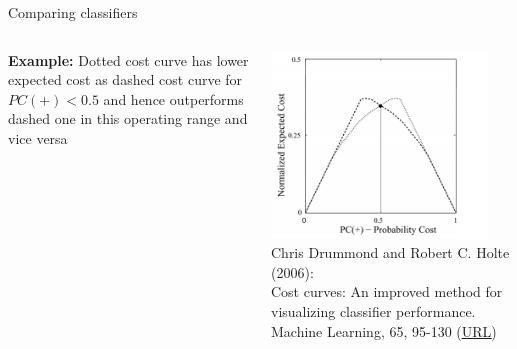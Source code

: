 \documentclass[11pt,compress,t,notes=noshow, xcolor=table]{beamer}
\begin{document}
\begin{vbframe}{Comparing classifiers}
\begin{columns}[T]
\begin{column}{0.6\textwidth}
\textbf{Example:} Dotted cost curve has lower expected cost as dashed cost curve for $PC(+) < 0.5$ and hence outperforms dashed one in this operating range and vice versa
\end{column}
\begin{column}{0.39\textwidth}
\includegraphics[width=0.9\textwidth]{figure_man/cost-curves-classifiers-comparison.png}
    \tiny
    \\Chris Drummond and Robert C. Holte (2006): \\
    Cost curves: An improved method for visualizing classifier performance.
    Machine Learning, 65, 95-130
    (\href{https://www.semanticscholar.org/paper/Cost-curves\%3A-An-improved-method-for  -visualizing-Drummond-Holte/71708ce984e0896e7383435913547e770572410e}
    {\underline{URL}})
\end{column}
\end{columns}


\end{vbframe}
\end{document}
